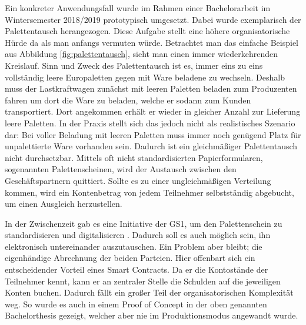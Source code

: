 Ein konkreter Anwendungsfall wurde im Rahmen einer Bachelorarbeit im Wintersemester 2018/2019 prototypisch umgesetzt. Dabei wurde exemplarisch der Palettentausch herangezogen. Diese Aufgabe stellt eine höhere organisatorische Hürde da als man anfangs vermuten würde. Betrachtet man das einfache Beispiel aus Abbildung \ref{fig:palettentausch}, sieht man einen immer wiederkehrenden Kreislauf. Sinn und Zweck des Palettentausch ist es, immer eins zu eins vollständig leere Europaletten gegen mit Ware beladene zu wechseln. Deshalb muss der Lastkraftwagen zunächst mit leeren Paletten beladen zum Produzenten fahren um dort die Ware zu beladen, welche er sodann zum Kunden transportiert. Dort angekommen erhält er wieder in gleicher Anzahl zur Lieferung leere Paletten. In der Praxis stellt sich das jedoch nicht als realistisches Szenario dar: Bei voller Beladung mit leeren Paletten muss immer noch genügend Platz für unpalettierte Ware vorhanden sein. Dadurch ist ein gleichmäßiger Palettentausch nicht durchsetzbar. Mittels oft nicht standardisierten Papierformularen, sogenannten Palettenscheinen, wird der Austausch zwischen den Geschäftspartnern quittiert. Sollte es zu einer ungleichmäßigen Verteilung kommen, wird ein Kontenbetrag von jedem Teilnehmer selbstständig abgebucht, um einen Ausgleich herzustellen. \cite[vgl.][]{Disponaut2016}

In der Zwischenzeit gab es eine Initiative der GS1, um den Palettenschein zu standardisieren und digitalisieren \cite[vgl.][]{GS12017}. Dadurch soll es auch möglich sein, ihn elektronisch untereinander auszutauschen. Ein Problem aber bleibt; die eigenhändige Abrechnung der beiden Parteien. Hier offenbart sich ein entscheidender Vorteil eines Smart Contracts. Da er die Kontostände der Teilnehmer kennt, kann er an zentraler Stelle die Schulden auf die jeweiligen Konten buchen. Dadurch fällt ein großer Teil der organisatorischen Komplexität weg. So wurde es auch in einem Proof of Concept in der oben genannten Bachelorthesis gezeigt, welcher aber nie im Produktionsmodus angewandt wurde.


